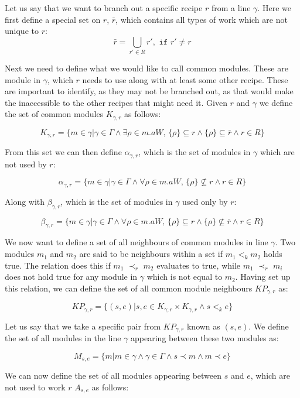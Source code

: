 Let us say that we want to branch out a specific recipe $r$ from a line $\gamma$. Here we first define a special set on $r$, $\bar{r}$, which contains all types of work which are not unique to $r$:
\[\bar{r} = \bigcup_{r' \in R}r', \texttt{ if } r' \neq r\]

Next we need to define what we would like to call common modules. These are module in $\gamma$, which $r$ needs to use along with at least some other recipe. These are important to identify, as they may not be branched out, as that would make the inaccessible to the other recipes that might need it.  Given $r$ and $\gamma$ we define the set of common modules $K_{\gamma ,r}$ as follows:

\[K_{\gamma ,r} = \{m \in \gamma | \gamma \in \Gamma \land \exists \rho \in m.aW,\, \{\rho\} \subseteq r \land \{\rho\} \subseteq \bar{r} \land r \in R\}\]

From this set we can then define $\alpha_{\gamma ,r}$, which is the set of modules in $\gamma$ which are not used by $r$: 

\[\alpha_{\gamma ,r}  = \{m \in \gamma | \gamma \in \Gamma \land \forall \rho \in m.aW,\, \{\rho\} \nsubseteq r \land r \in R\}\]

Along with $\beta_{\gamma ,r}$, which is the set of modules in $\gamma$ used only by $r$:

\[\beta_{\gamma ,r}  = \{m \in \gamma | \gamma \in \Gamma \land \forall \rho \in m.aW,\, \{\rho\} \subseteq r \land \{\rho\} \nsubseteq \bar{r} \land r \in R\}\]

We now want to define a set of all neighbours of common modules in line $\gamma$. Two modules $m_1$ and $m_2$ are said to be neighbours within a set if $m_1 <_k m_2$ holds true. The relation does this if $m_1$ $\prec_r$ $m_2$ evaluates to true, while $m_1$ $\prec_r$ $m_i$ does not hold true for any module in $\gamma$ which is not equal to $m_2$. Having set up this relation, we can define the set of all common module neighbours $KP_{\gamma ,r}$ as:
 
\[KP_{\gamma ,r} = \{(s, e)| {s, e} \in K_{\gamma ,r} \times K_{\gamma ,r} \land s <_k  e\}\]

Let us say that we take a specific pair from $KP_{\gamma ,r}$  known as $(s,e)$. We define the set of all modules in the line $\gamma$ appearing between these two modules as: 

\[M_{s,e} = \{m | m \in \gamma \land \gamma \in \Gamma \land s \prec m \land m \prec e\}\]

We can now define the set of all modules appearing between $s$ and $e$, which are not used to work $r$ $A_{s,e}$ as follows: 

